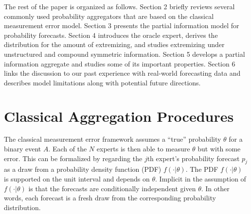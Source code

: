 \documentclass[11pt]{article}
\theoremstyle{definition}
\theoremstyle{definition}
\begin{document}
 
 
 












The rest of the paper is organized as follows. Section 2 briefly reviews several commonly used probability aggregators that are based on the classical measurement error model. Section 3 presents the partial information model for probability forecasts. Section 4 introduces the oracle expert, derives the distribution for the amount of extremizing, and studies extremizing under unstructured and compound symmetric information. Section 5 develops a partial information aggregate and studies some of its important properties. Section 6 links the discussion to our past experience with real-world forecasting data and describes model limitations along with potential future directions. 


\section{Classical Aggregation Procedures}
The classical measurement error framework assumes a ``true'' probability $\theta$ for a binary event $A$. Each of the $N$  experts is then able to measure $\theta$ but with some error. This can be formalized by regarding the $j$th expert's probability forecast $p_j$ as a draw from a probability density function (PDF) $f(\cdot | \theta)$. The PDF $f(\cdot | \theta)$ is supported on the unit interval and depends on $\theta$. Implicit in the assumption of $f(\cdot | \theta)$ is that the forecasts are conditionally independent given $\theta$. In other words, each forecast is a fresh draw from the corresponding probability distribution. 
\end{document}
